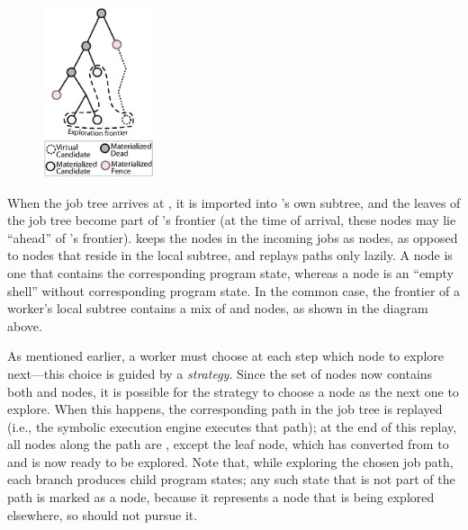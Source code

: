 \begin{figure}
\vspace{-5mm}
%
\hspace{-10mm}\includegraphics[height=50mm]{paas/figures/worker-tree-thumb}
\vspace{-8mm}
\end{figure}

When the job tree arrives at \wdst, it is imported into \wdst's own subtree, and the leaves of the job tree become part of \wdst's frontier (at the time of arrival, these nodes may lie ``ahead'' of \wdst's frontier).  \wdst keeps the nodes in the incoming jobs as {\em \virtual} nodes, as opposed to {\em \materialized} nodes that reside in the local subtree, and replays paths only lazily.  A \materialized node is one that contains the corresponding program state, whereas a \virtual node is an ``empty shell'' without corresponding program state.  In the common case, the frontier of a worker's local subtree contains a mix of \materialized and \virtual nodes, as shown in the diagram above.

As mentioned earlier, a worker must choose at each step which \candidate node to explore next---this choice is guided by a {\em strategy}.  Since the set of \candidate nodes now contains both \materialized and \virtual nodes, it is possible for the strategy to choose a \virtual node as the next one to explore.  When this happens, the corresponding path in the job tree is replayed (i.e., the symbolic execution engine executes that path); at the end of this replay, all nodes along the path are \dead, except the leaf node, which has converted from \virtual to \materialized and is now ready to be explored.  Note that, while exploring the chosen job path, each branch produces child program states; any such state that is not part of the path is marked as a \fence node, because it represents a node that is being explored elsewhere, so \wdst should not pursue it.

